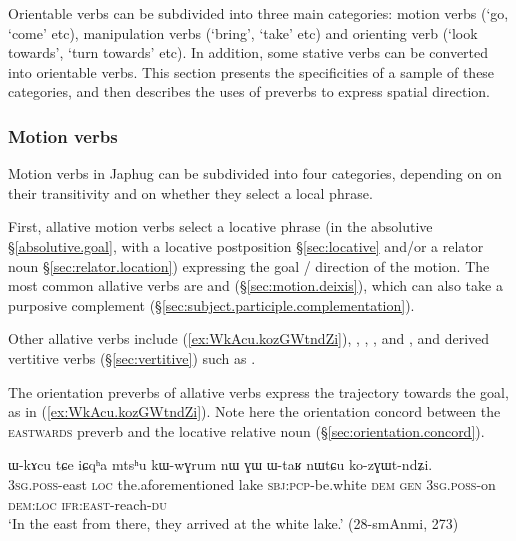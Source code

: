 Orientable verbs can be subdivided into three main categories: motion verbs (`go, `come' etc), manipulation verbs (`bring', `take' etc) and orienting verb (`look towards', `turn towards' etc). In addition, some stative verbs can be converted into orientable verbs. This section presents the specificities of a sample of these categories, and then describes the uses of preverbs to express spatial direction.

\subsubsection{Motion verbs} \label{sec:motion.verbs}
Motion verbs in Japhug can be subdivided into four categories, depending on on their transitivity and on whether they select a local phrase.

First, allative motion verbs select a locative phrase (in the absolutive §\ref{absolutive.goal}, with a locative postposition §\ref{sec:locative} and/or a relator noun §\ref{sec:relator.location}) expressing the goal / direction of the motion. The most common allative verbs are  and  (§\ref{sec:motion.deixis}), which can also take a purposive complement (§\ref{sec:subject.participle.complementation}).

Other allative verbs include  (\ref{ex:WkAcu.kozGWtndZi}), , , ,  and , and derived vertitive verbs (§\ref{sec:vertitive}) such as .

The orientation preverbs of allative verbs express the trajectory towards the goal, as in (\ref{ex:WkAcu.kozGWtndZi}). Note here the orientation concord between the \textsc{eastwards} preverb  and the locative relative noun  (§\ref{sec:orientation.concord}).

\begin{exe}
	\ex \label{ex:WkAcu.kozGWtndZi}
	\gll ɯ-kɤcu tɕe iɕqʰa mtsʰu kɯ-wɣrum nɯ ɣɯ ɯ-taʁ nɯtɕu ko-zɣɯt-ndʑi. \\ 
	\textsc{3sg}.\textsc{poss}-east \textsc{loc} the.aforementioned lake \textsc{sbj}:\textsc{pcp}-be.white \textsc{dem} \textsc{gen} \textsc{3sg}.\textsc{poss}-on \textsc{dem}:\textsc{loc} \textsc{ifr}:\textsc{east}-reach-\textsc{du} \\
	\glt `In the east from there, they arrived at the white lake.' (28-smAnmi, 273)
\end{exe}



